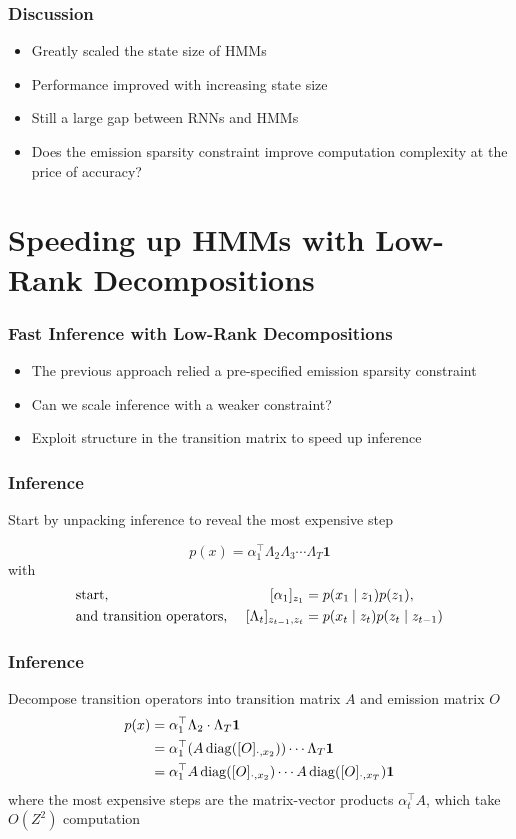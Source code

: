 \documentclass{beamer}
\begin{document}
\begin{frame}
\frametitle{Discussion}
\begin{itemize}
\item Greatly scaled the state size of HMMs
\vspace{2em}
\item Performance improved with increasing state size
\vspace{2em}
\item Still a large gap between RNNs and HMMs
\vspace{2em}
\item Does the emission sparsity constraint improve
    computation complexity at the price of accuracy?
\end{itemize}
\end{frame}


\section{Speeding up HMMs with Low-Rank Decompositions}

\begin{frame}
\frametitle{Fast Inference with Low-Rank Decompositions}
\begin{itemize}
\item The previous approach relied a pre-specified emission sparsity constraint
\vspace{2em}
\item Can we scale inference with a weaker constraint?
\vspace{2em}
\item Exploit structure in the transition matrix to speed up inference
\end{itemize}
\end{frame}

\begin{frame}
\frametitle{Inference}
Start by unpacking inference to reveal the most expensive step

$$p(x) = \alpha_1^\top\Lambda_2\Lambda_3\cdots\Lambda_T\mathbf{1}$$
with
\begin{align*}
&\textnormal{start, } & [\alpha_1]_{z_1} &= p(x_1\mid z_1)p(z_1),\\
&\textnormal{and transition operators, }
    & [\Lambda_t]_{z_{t-1},z_t} &= p(x_t \mid z_t)p(z_t \mid z_{t-1})
\end{align*}
\end{frame}

\begin{frame}
\frametitle{Inference}
Decompose transition operators into transition matrix $A$ and emission matrix $O$
\begin{align*}
p(x) &= \alpha_1^\top\Lambda_2\cdot\Lambda_T\mathbf{1}\\
&= \alpha_1^\top (A \operatorname{diag}([O]_{\cdot,x_2}))  \cdots\Lambda_T\mathbf{1}\\
&= \alpha_1^\top A \operatorname{diag}([O]_{\cdot,x_2}) \cdots A \operatorname{diag}([O]_{\cdot,x_T}) \mathbf{1}
\end{align*}
where the most expensive steps are the matrix-vector products $\alpha_t^\top A$,
which take $O(Z^2)$ computation

\end{frame}
\end{document}
